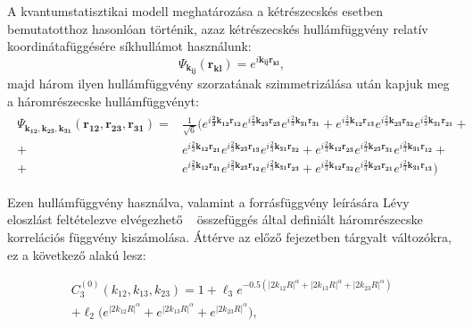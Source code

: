 \documentclass[11pt,a4paper]{article}
\numberwithin{equation}{subsection}
\numberwithin{figure}{section}
\begin{document}
A kvantumstatisztikai modell meghatározása a kétrészecskés esetben bemutatotthoz hasonlóan történik, azaz kétrészecskés hullámfüggvény relatív koordinátafüggésére síkhullámot használunk:
\begin{equation}
\Psi_{\boldsymbol{k_{ij}}}(\boldsymbol{r_{kl}})=e^{i\boldsymbol{k_{ij}}\boldsymbol{r_{kl}}},
\end{equation}
majd három ilyen hullámfüggvény szorzatának szimmetrizálása után kapjuk meg a háromrészecske hullámfüggvényt:
\begin{align}
\begin{split}
\Psi_{\boldsymbol{k_{12}},\boldsymbol{k_{23}},\boldsymbol{k_{31}}}(\boldsymbol{r_{12}},\boldsymbol{r_{23}},\boldsymbol{r_{31}})=&\frac{1}{\sqrt{6}}\Big(e^{i\boldsymbol{\frac{2}{3}k_{12}}\boldsymbol{r_{12}}}e^{i\frac{2}{3}\boldsymbol{k_{23}}\boldsymbol{r_{23}}}
e^{i\frac{2}{3}\boldsymbol{k_{31}}\boldsymbol{r_{31}}}+
e^{i\frac{2}{3}\boldsymbol{k_{12}}\boldsymbol{r_{13}}}e^{i\frac{2}{3}\boldsymbol{k_{23}}\boldsymbol{r_{32}}}
e^{i\frac{2}{3}\boldsymbol{k_{31}}\boldsymbol{r_{21}}}+\\
+&e^{i\frac{2}{3}\boldsymbol{k_{12}}\boldsymbol{r_{21}}}e^{i\frac{2}{3}\boldsymbol{k_{23}}\boldsymbol{r_{13}}}
e^{i\frac{2}{3}\boldsymbol{k_{31}}\boldsymbol{r_{32}}}+
e^{i\frac{2}{3}\boldsymbol{k_{12}}\boldsymbol{r_{23}}}e^{i\frac{2}{3}\boldsymbol{k_{23}}\boldsymbol{r_{31}}}
e^{i\frac{2}{3}\boldsymbol{k_{31}}\boldsymbol{r_{12}}}+\\
+&e^{i\frac{2}{3}\boldsymbol{k_{12}}\boldsymbol{r_{31}}}e^{i\frac{2}{3}\boldsymbol{k_{23}}\boldsymbol{r_{12}}}
e^{i\frac{2}{3}\boldsymbol{k_{31}}\boldsymbol{r_{23}}}+
e^{i\frac{2}{3}\boldsymbol{k_{12}}\boldsymbol{r_{32}}}e^{i\frac{2}{3}\boldsymbol{k_{23}}\boldsymbol{r_{21}}}
e^{i\frac{2}{3}\boldsymbol{k_{31}}\boldsymbol{r_{13}}}\Big)
\label{eq:psi3}
\end{split}
\end{align}

Ezen hullámfüggvény használva, valamint a forrásfüggvény leírására Lévy eloszlást feltételezve elvégezhető ~ összefüggés által definiált háromrészecske korrelációs függvény kiszámolása. Áttérve az előző fejezetben tárgyalt változókra, ez a következő alakú lesz:

\begin{align}
C_3^{(0)}(k_{12}, k_{13}, k_{23}) = 1+ \ell_3e^{-0.5(|2k_{12}R|^\alpha+|2k_{13}R|^\alpha+|2k_{23}R|^\alpha)}\nonumber\\
+\ell_2\bigg(e^{|2k_{12}R|^\alpha}+e^{|2k_{13}R|^\alpha}+e^{|2k_{23}R|^\alpha}\bigg),
\end{align}
\end{document}
